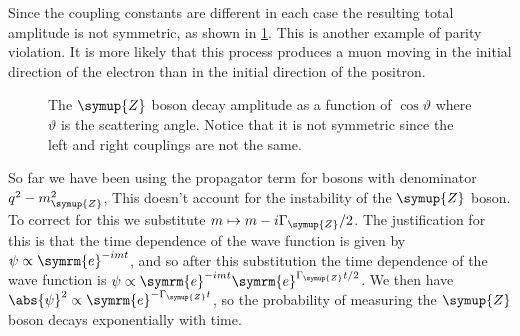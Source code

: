 \documentclass[fleqn]{NotesClass}
\newcommand{\Pparticle}[1]{\symup{#1}}
\newcommand{\PZ}{\ensuremath{\Pparticle{Z}}}
\newcommand{\e}{\symrm{e}}
\newcommand{\amplitude}{\symcal{M}}
\newcommand{\Left}{\symrm{L}}
\newcommand{\Right}{\symrm{R}}
\begin{document}
    Since the coupling constants are different in each case the resulting total amplitude is not symmetric, as shown in \cref{fig:Z boson decay amplitude}.
    This is another example of parity violation.
    It is more likely that this process produces a muon moving in the initial direction of the electron than in the initial direction of the positron.
    
    \begin{figure}
        \caption[\PZ{} boson decay amplitude]{The \PZ{} boson decay amplitude as a function of \(\cos\vartheta\) where \(\vartheta\) is the scattering angle. Notice that it is not symmetric since the left and right couplings are not the same.}
        \label{fig:Z boson decay amplitude}
    \end{figure}
    
    So far we have been using the propagator term for bosons with denominator \(q^2 - m_{\PZ}^2\),
    This doesn't account for the instability of the \PZ{} boson.
    To correct for this we substitute \(m \mapsto m - i\Gamma_{\PZ}/2\).
    The justification for this is that the time dependence of the wave function is given by \(\psi \propto \e^{-imt}\), and so after this substitution the time dependence of the wave function is \(\psi \propto \e^{-imt}\e^{\Gamma_{\PZ}t/2}\).
    We then have \(\abs{\psi}^2 \propto \e^{-\Gamma_{\PZ}t}\), so the probability of measuring the \PZ{} boson decays exponentially with time.
    
\end{document}
